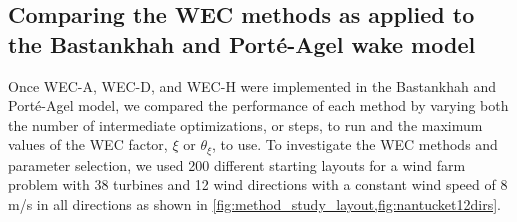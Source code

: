 \documentclass[a4paper]{jpconf}
\begin{document}
\subsection{Comparing the WEC methods as applied to the Bastankhah and Port\'e-Agel wake model}\label{sec:bpa_wec_comparison}

Once WEC-A, WEC-D, and WEC-H were implemented in the Bastankhah and Port\'{e}-Agel model, we compared the performance of each method by varying both the number of intermediate optimizations, or steps, to run and the maximum values of the WEC factor, $\xi$ or $\theta_\xi$, to use. To investigate the WEC methods and parameter selection, we used 200 different starting layouts for a wind farm problem with 38 turbines and 12 wind directions with a constant wind speed of 8 m/s in all directions as shown in \cref{fig:method_study_layout,fig:nantucket12dirs}. 
\end{document}
